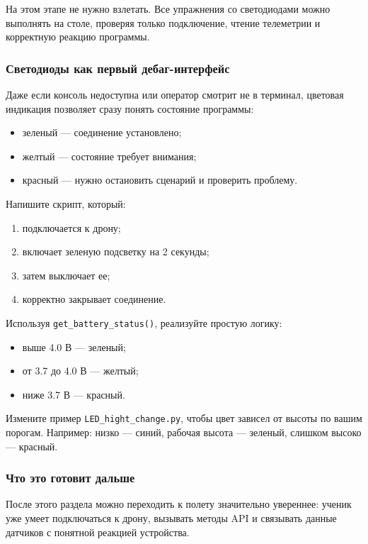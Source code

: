 \begin{warnbox}
На этом этапе не нужно взлетать. Все упражнения со светодиодами можно выполнять на столе, проверяя только подключение, чтение телеметрии и корректную реакцию программы.
\end{warnbox}
 
\subsubsection*{Светодиоды как первый дебаг-интерфейс}
Даже если консоль недоступна или оператор смотрит не в терминал, цветовая индикация позволяет сразу понять состояние программы:
\begin{itemize}
    \item зеленый --- соединение установлено;
    \item желтый --- состояние требует внимания;
    \item красный --- нужно остановить сценарий и проверить проблему.
\end{itemize}
 
\begin{taskbox}
Напишите скрипт, который:
\begin{enumerate}
    \item подключается к дрону;
    \item включает зеленую подсветку на 2 секунды;
    \item затем выключает ее;
    \item корректно закрывает соединение.
\end{enumerate}
\end{taskbox}
 
\begin{taskbox}
Используя \texttt{get\_battery\_status()}, реализуйте простую логику:
\begin{itemize}
    \item выше 4.0 В --- зеленый;
    \item от 3.7 до 4.0 В --- желтый;
    \item ниже 3.7 В --- красный.
\end{itemize}
\end{taskbox}
 
\begin{taskbox}
Измените пример \texttt{LED\_hight\_change.py}, чтобы цвет зависел от высоты по вашим порогам. Например: низко --- синий, рабочая высота --- зеленый, слишком высоко --- красный.
\end{taskbox}
 
\subsubsection*{Что это готовит дальше}
После этого раздела можно переходить к полету значительно увереннее: ученик уже умеет подключаться к дрону, вызывать методы API и связывать данные датчиков с понятной реакцией устройства.
